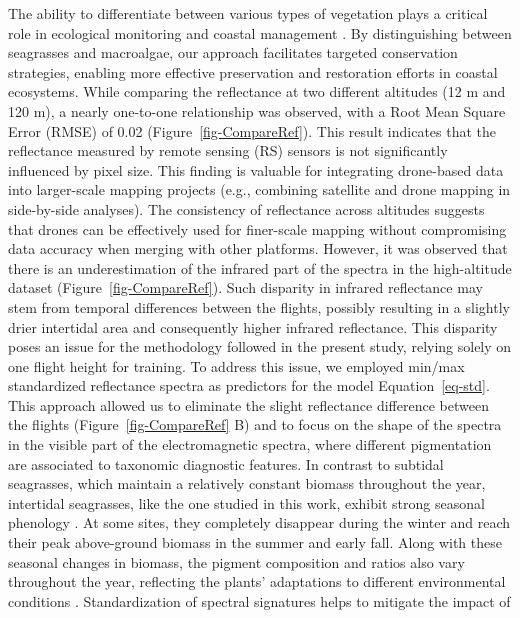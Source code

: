 \documentclass[
  number]{elsarticle}
\begin{document}
The ability to differentiate between various types of vegetation plays a
critical role in ecological monitoring and coastal management
\citep{WFD2000}. By distinguishing between seagrasses and macroalgae,
our approach facilitates targeted conservation strategies, enabling more
effective preservation and restoration efforts in coastal ecosystems.
While comparing the reflectance at two different altitudes (12 m and 120
m), a nearly one-to-one relationship was observed, with a Root Mean
Square Error (RMSE) of 0.02 (Figure~\ref{fig-CompareRef}). This result
indicates that the reflectance measured by remote sensing (RS) sensors
is not significantly influenced by pixel size. This finding is valuable
for integrating drone-based data into larger-scale mapping projects
(e.g., combining satellite and drone mapping in side-by-side analyses).
The consistency of reflectance across altitudes suggests that drones can
be effectively used for finer-scale mapping without compromising data
accuracy when merging with other platforms. However, it was observed
that there is an underestimation of the infrared part of the spectra in
the high-altitude dataset (Figure~\ref{fig-CompareRef}). Such disparity
in infrared reflectance may stem from temporal differences between the
flights, possibly resulting in a slightly drier intertidal area and
consequently higher infrared reflectance. This disparity poses an issue
for the methodology followed in the present study, relying solely on one
flight height for training. To address this issue, we employed min/max
standardized reflectance spectra as predictors for the model
Equation~\ref{eq-std}. This approach allowed us to eliminate the slight
reflectance difference between the flights (Figure~\ref{fig-CompareRef}
B) and to focus on the shape of the spectra in the visible part of the
electromagnetic spectra, where different pigmentation are associated to
taxonomic diagnostic features. In contrast to subtidal seagrasses, which
maintain a relatively constant biomass throughout the year, intertidal
seagrasses, like the one studied in this work, exhibit strong seasonal
phenology \citep{davies2024sentinel}. At some sites, they completely
disappear during the winter and reach their peak above-ground biomass in
the summer and early fall. Along with these seasonal changes in biomass,
the pigment composition and ratios also vary throughout the year,
reflecting the plants' adaptations to different environmental conditions
\citetext{\citealp[ ]{bargain2013seasonal}; \citealp{legare2022remote}}.
Standardization of spectral signatures helps to mitigate the impact of
\end{document}
